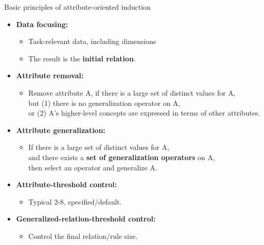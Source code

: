 \documentclass[aspectratio=169,t]{beamer}
\begin{document}
  { 
    \begin{frame}{Basic principles of attribute-oriented induction}
    \begin{itemize}
      \item \textbf{Data focusing:}
      \begin{itemize}
        \item Task-relevant data, including dimensions
        \item The result is the \textbf{\color{airforceblue}initial relation}.
      \end{itemize}
      \item \textbf{\color{airforceblue}Attribute removal:}
      \begin{itemize}
        \item Remove attribute A, if there is a large set of distinct values for A,\\
        but (1) there is no generalization operator on A,\\
        or (2) A's higher-level concepts are expressed in terms of other attributes.
      \end{itemize}
      \item \textbf{\color{airforceblue}Attribute generalization:}
      \begin{itemize}
        \item If there is a large set of distinct values for A,\\
              and there exists a \textbf{\color{airforceblue}set of generalization operators} on A,\\
              then select an operator and generalize A.
      \end{itemize}
      \item \textbf{Attribute-threshold control:}
      \begin{itemize}
        \item Typical 2-8, specified/default.
      \end{itemize}
      \item \textbf{Generalized-relation-threshold control:}
      \begin{itemize}
        \item Control the final relation/rule size.
      \end{itemize}
    \end{itemize}
    \end{frame}
  }
\end{document}
